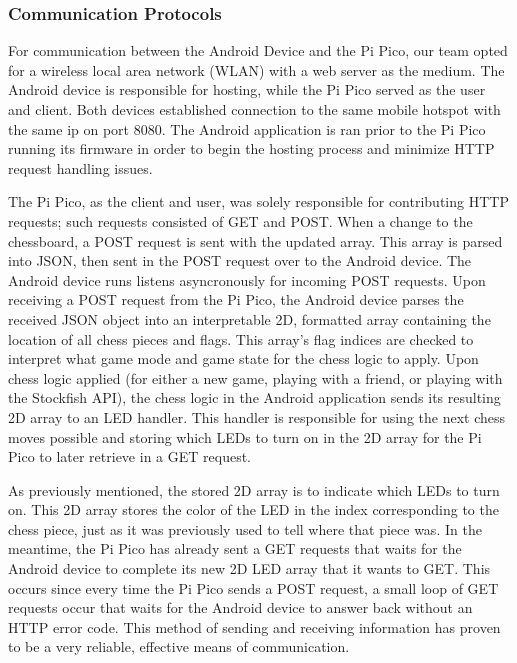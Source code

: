 \documentclass[11pt,journal]{IEEEtran}
\begin{document}
\subsubsection{Communication Protocols}
For communication between the Android Device and the Pi Pico, our team opted for a wireless local area network (WLAN) with a web server as the medium. The Android device is responsible for hosting, while the Pi Pico served as the user and client. Both devices established connection to the same mobile hotspot with the same ip on port 8080. The Android application is ran prior to the Pi Pico running its firmware in order to begin the hosting process and minimize HTTP request handling issues.

The Pi Pico, as the client and user, was solely responsible for contributing HTTP requests; such requests consisted of GET and POST. When a change to the chessboard, a POST request is sent with the updated array. This array is parsed into JSON, then sent in the POST request over to the Android device. The Android device runs listens asyncronously for incoming POST requests. Upon receiving a POST request from the Pi Pico, the Android device parses the received JSON object into an interpretable 2D, formatted array containing the location of all chess pieces and flags. This array's flag indices are checked to interpret what game mode and game state for the chess logic to apply. Upon chess logic applied (for either a new game, playing with a friend, or playing with the Stockfish API), the chess logic in the Android application sends its resulting 2D array to an LED handler. This handler is responsible for using the next chess moves possible and storing which LEDs to turn on in the 2D array for the Pi Pico to later retrieve in a GET request.

As previously mentioned, the stored 2D array is to indicate which LEDs to turn on. This 2D array stores the color of the LED in the index corresponding to the chess piece, just as it was previously used to tell where that piece was. In the meantime, the Pi Pico has already sent a GET requests that waits for the Android device to complete its new 2D LED array that it wants to GET. This occurs since every time the Pi Pico sends a POST request, a small loop of GET requests occur that waits for the Android device to answer back without an HTTP error code. This method of sending and receiving information has proven to be a very reliable, effective means of communication.


\end{document}

